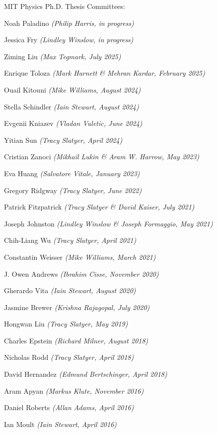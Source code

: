 \bbl

\item MIT Physics Ph.D. Thesis Committees:
\bsbl 
\item Noah Paladino \textit{(Philip Harris, in progress)}
\item Jessica Fry \textit{(Lindley Winslow, in progress)}
\item Ziming Liu \textit{(Max Tegmark, July 2025)}
\item Enrique Toloza \textit{(Mark Harnett \& Mehran Kardar, February 2025)}
\item Ouail Kitouni \textit{(Mike Williams, August 2024)}
\item Stella Schindler \textit{(Iain Stewart, August 2024)}
\item Evgenii Kniazev \textit{(Vladan Vuletic, June 2024)}
\item Yitian Sun \textit{(Tracy Slatyer, April 2024)}
\item Cristian Zanoci \textit{(Mikhail Lukin \& Aram W. Harrow, May 2023)}
\item Eva Huang \textit{(Salvatore Vitale, January 2023)}
\item Gregory Ridgway \textit{(Tracy Slatyer, June 2022)}
\item Patrick Fitzpatrick \textit{(Tracy Slatyer \& David Kaiser, July 2021)}
\item Joseph Johnston \textit{(Lindley Winslow \& Joseph Formaggio, May 2021)}
\item Chih-Liang Wu \textit{(Tracy Slatyer, April 2021)}
\item Constantin Weisser \textit{(Mike Williams, March 2021)}
\item J. Owen Andrews \textit{(Ibrahim Cisse, November 2020)}
\item Gherardo Vita \textit{(Iain Stewart, August 2020)}
\item Jasmine Brewer \textit{(Krishna Rajagopal, July 2020)}
\item Hongwan Liu \textit{(Tracy Slatyer, May 2019)}
\item Charles Epstein \textit{(Richard Milner, August 2018)}
\item Nicholas Rodd \textit{(Tracy Slatyer, April 2018)}
\item David Hernandez \textit{(Edmund Bertschinger, April 2018)}
\item Aram Apyan \textit{(Markus Klute, November 2016)}
\item Daniel Roberts \textit{(Allan Adams, April 2016)}
\item Ian Moult \textit{(Iain Stewart, April 2016)}
